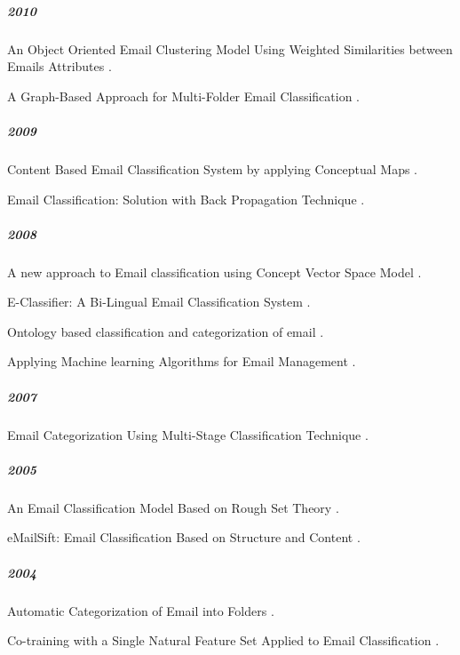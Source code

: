 \subparagraph{2010}
\begin{my_itemize}
  \item An Object Oriented Email Clustering Model Using Weighted Similarities between Emails Attributes \cite{NARESH10}.
  \item A Graph-Based Approach for Multi-Folder Email Classification \cite{sift02}.
\end{my_itemize}

\subparagraph{2009}
\begin{my_itemize}
  \item Content Based Email Classification System by applying Conceptual Maps \cite{BASKARAN09}.
  \item Email Classification: Solution with Back Propagation Technique \cite{mous05}.
\end{my_itemize}

\subparagraph{2008}
\begin{my_itemize}
  \item A new approach to Email classification using Concept Vector Space Model \cite{CHAO08}.
  \item E-Classifier: A Bi-Lingual Email Classification System \cite{NOUF08}.
  \item Ontology based classification and categorization of email \cite{BALAKUMAR08}.
  \item Applying Machine learning Algorithms for Email Management \cite{mous03}.
\end{my_itemize}

\subparagraph{2007}
\begin{my_itemize}
  \item Email Categorization Using Multi-Stage Classification Technique \cite{MD07}.
\end{my_itemize}

\subparagraph{2005}
\begin{my_itemize}
  \item An Email Classification Model Based on Rough Set Theory \cite{WENQING05}.
  \item eMailSift: Email Classification Based on Structure and Content \cite{sift01}.
\end{my_itemize}

\subparagraph{2004}
\begin{my_itemize}
  \item Automatic Categorization of Email into Folders \cite{RON04}.
  \item Co-training with a Single Natural Feature Set Applied to Email Classification \cite{mous04}.
\end{my_itemize}

